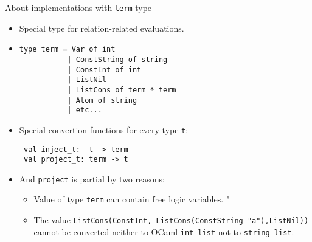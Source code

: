 \documentclass [mathserif]{beamer}
\theoremstyle{definition}
\begin{document}
\begin{frame}[fragile]{About implementations with \texttt{term} type}
\begin{itemize}
 \item Special type for relation-related evaluations.
 \item \begin{lstlisting}
type term = Var of int
           | ConstString of string
           | ConstInt of int
           | ListNil
           | ListCons of term * term
           | Atom of string
           | etc...
 \end{lstlisting}
 \item Special convertion functions for every type \texttt{t}: \begin{lstlisting}
 val inject_t:  t -> term
 val project_t: term -> t
 \end{lstlisting}
 \item And \texttt{project} is partial by two reasons: 
  \begin{itemize}
    \item Value of type \texttt{term} can contain free logic variables. "
    \item The value \texttt{ListCons(ConstInt, ListCons(ConstString "a"),ListNil))} cannot be converted 
    neither to OCaml \texttt{int list} not to \texttt{string list}.
  \end{itemize}

\end{itemize}

 
\end{frame}
\end{document}
